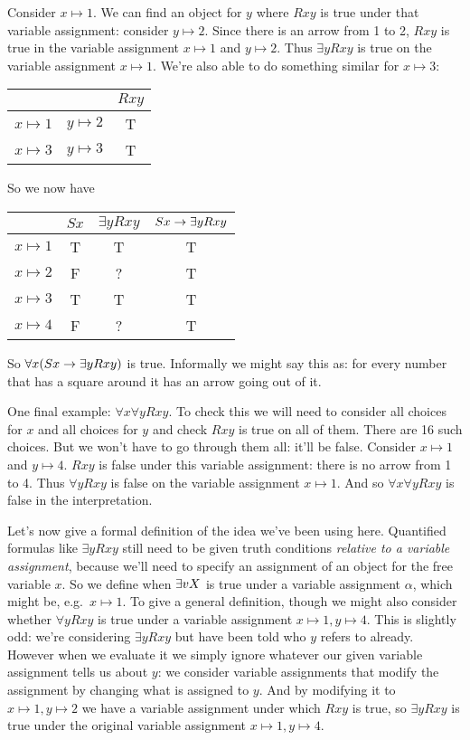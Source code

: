 Consider $x\mapsto 1$. We can find an object for $y$ where $Rxy$ is true under that variable assignment: consider $y\mapsto 2$. Since there is an arrow from 1 to 2, $Rxy$ is true in the variable assignment $x\mapsto 1$ and $y\mapsto 2$. Thus $\exists y Rxy$ is true on the variable assignment $x\mapsto 1$. We're also able to do something similar for $x\mapsto 3$:
\begin{center}
\begin{tabular}{cc|c}
&&$Rxy$\Bstrut\\\hline\Tstrut
$x\mapsto 1$&$y\mapsto 2$&T\\
$x\mapsto 3$&$y\mapsto 3$&T
 \end{tabular}
\end{center}So we now have
\begin{center}
\begin{tabular}{c|ccc}
&$Sx$&$\exists y Rxy$&$Sx\rightarrow\exists y Rxy$\Bstrut\\\hline\Tstrut
$x\mapsto 1$&T&T&T\\
$x\mapsto 2$&F&?&T\\
$x\mapsto 3$&T&T&T\\
$x\mapsto 4$&F&?&T
\end{tabular}
\end{center}So $\forall x(Sx\rightarrow \exists y Rxy)$ is true. Informally we might say this as: for every number that has a square around it has an arrow going out of it.

One final example: $\forall x\forall y Rxy$. To check this we will need to consider all choices for $x$ and all choices for $y$ and check $Rxy$ is true on all of them. There are 16 such choices. But we won't have to go through them all: it'll be false. Consider $x\mapsto 1$ and $y\mapsto 4$. $Rxy$ is false under this variable assignment: there is no arrow from 1 to 4. Thus $\forall yRxy$ is false on the variable assignment $x\mapsto 1$. And so $\forall x\forall y Rxy$ is false in the interpretation.

 Let's now give a formal definition of the idea we've been using here. Quantified formulas like $\exists y Rxy$ still need to be given truth conditions \emph{relative to a variable assignment}, because we'll need to specify an assignment of an object for the free variable $x$. So we define when $\exists vX$ is true under a variable assignment $\alpha$, which might be, e.g.~$x\mapsto 1$. To give a general definition, though we might also consider whether $\forall y Rxy$ is true under a variable assignment $x\mapsto 1, y\mapsto 4$. This is slightly odd: we're considering $\exists y Rxy$ but have been told who $y$ refers to already. However when we evaluate it we simply ignore whatever our given variable assignment tells us about $y$: we consider variable assignments that modify the assignment by changing what is assigned to $y$. And by modifying it to $x\mapsto 1, y\mapsto2$ we have a variable assignment under which $Rxy$ is true, so $\exists y Rxy$ is true under the original variable assignment $x\mapsto 1, y\mapsto 4$.

